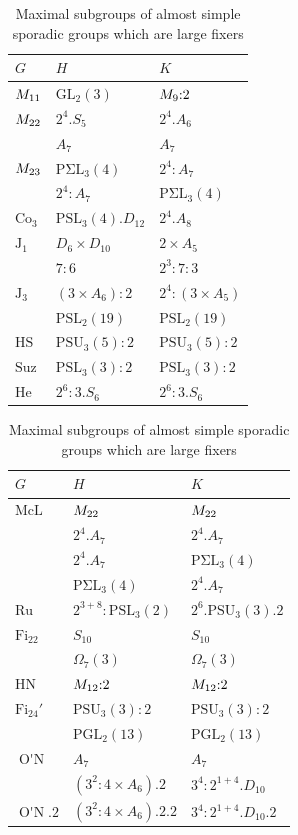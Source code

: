 \documentclass[twoside,a4paper,reqno,11pt]{amsart}
\newcommand{\<}{\langle}
\renewcommand{\>}{\rangle}
\newcommand{\PSL}{\mathrm{PSL}}
\newcommand{\GL}{\mathrm{GL}}
\newcommand{\PGL}{\mathrm{PGL}}
\newcommand{\PSigmaL}{\mathrm{P\Sigma L}}
\newcommand{\PSU}{\mathrm{PSU}}
\def\Ma{{\rm M}}
\theoremstyle{definition}
\begin{document}
	{\small
		\begin{table}[h!]
			\begin{tabular}{@{}lll@{}}
				\toprule
				$G$ & $H$ & $K$ \\ \midrule
				$\Ma_{11}$&$\GL_2(3)$&$\Ma_9{:}2$\\
				$\Ma_{22}$&$2^4.S_5$&$2^4.A_6$\\
				&$A_7$&$A_7$\\
				$\Ma_{23}$&$\PSigmaL_3(4)$&$2^4{:}A_7$\\
				&$2^4{:}A_7$&$\PSigmaL_3(4)$\\
				$\mathrm{Co}_3$&$\PSL_3(4).D_{12}$&$2^4.A_8$\\
				$\mathrm{J}_1$&$D_6\times D_{10}$&$2\times A_5$\\
				&$7{:}6$&$2^3{:}7{:}3$\\
				$\mathrm{J}_3$&$(3\times A_6){:}2$&$2^4{:}(3\times A_5)$\\
				&$\PSL_2(19)$&$\PSL_2(19)$\\
				$\mathrm{HS}$&$\PSU_3(5){:}2$&$\PSU_3(5){:}2$\\
				$\mathrm{Suz}$&$\PSL_3(3){:}2$&$\PSL_3(3){:}2$\\
				$\mathrm{He}$&$2^6{:}3.S_6$&$2^6{:}3.S_6$\\
				\bottomrule
			\end{tabular}
			\begin{tabular}{@{}lll@{}}
				\toprule
				$G$ & $H$ & $K$ \\ \midrule
				$\mathrm{McL}$&$\Ma_{22}$&$\Ma_{22}$\\
				&$2^4.A_7$&$2^4.A_7$\\
				&$2^4.A_7$&$\PSigmaL_3(4)$\\
				&$\PSigmaL_3(4)$&$2^4.A_7$\\
				$\mathrm{Ru}$&$2^{3+8}{:}\PSL_3(2)$&$2^6.\PSU_3(3).2$\\
				$\mathrm{Fi}_{22}$&$S_{10}$&$S_{10}$\\
				&$\Omega_7(3)$&$\Omega_7(3)$\\
				$\mathrm{HN}$&$\Ma_{12}{:}2$&$\Ma_{12}{:}2$\\
				$\mathrm{Fi}_{24}'$&$\PSU_3(3){:}2$&$\PSU_3(3){:}2$\\
				&$\PGL_2(13)$&$\PGL_2(13)$\\
				$\operatorname{O'N}$&$A_7$&$A_7$\\
				&$(3^2{:}4\times A_6).2$&$3^4{:}2^{1+4}.D_{10}$\\
				$\operatorname{O'N}.2$&$(3^2{:}4\times A_6).2.2$&$3^4{:}2^{1+4}.D_{10}.2$\\
				\bottomrule
			\end{tabular}
			\caption{Maximal subgroups of almost simple sporadic groups which are large fixers} \label{tab:sporadic}
		\end{table}
	}
	
\end{document}
